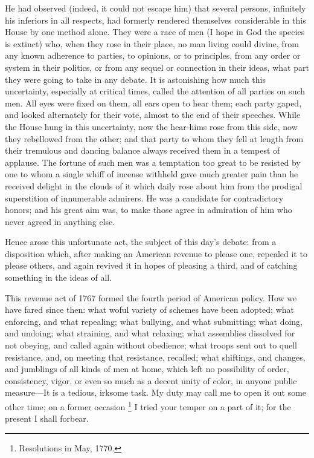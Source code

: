 He had observed (indeed, it could not escape him) that several persons, infinitely his inferiors in all respects, had formerly rendered themselves considerable in this House by one method alone. They were a race of men (I hope in God the species is extinct) who, when they rose in their place, no man living could divine, from any known adherence to parties, to opinions, or to principles, from any order or system in their politics, or from any sequel or connection in their ideas, what part they were going to take in any debate. It is astonishing how much this uncertainty, especially at critical times, called the attention of all parties on such men. All eyes were fixed on them, all ears open to hear them; each party gaped, and looked alternately for their vote, almost to the end of their speeches. While the House hung in this uncertainty, now the hear-hims rose from this side, now they rebellowed from the other; and that party to whom they fell at length from their tremulous and dancing balance always received them in a tempest of applause. The fortune of such men was a temptation too great to be resisted by one to whom a single whiff of incense withheld gave much greater pain than he received delight in the clouds of it which daily rose about him from the prodigal superstition of innumerable admirers. He was a candidate for contradictory honors; and his great aim was, to make those agree in admiration of him who never agreed in anything else.

Hence arose this unfortunate act, the subject of this day's debate: from a disposition which, after making an American revenue to please one, repealed it to please others, and again revived it in hopes of pleasing a third, and of catching something in the ideas of all.

This revenue act of 1767 formed the fourth period of American policy. How we have fared since then: what woful variety of schemes have been adopted; what enforcing, and what repealing; what bullying, and what submitting; what doing, and undoing; what straining, and what relaxing; what assemblies dissolved for not obeying, and called again without obedience; what troops sent out to quell resistance, and, on meeting that resistance, recalled; what shiftings, and changes, and jumblings of all kinds of men at home, which left no possibility of order, consistency, vigor, or even so much as a decent unity of color, in anyone public measure—It is a tedious, irksome task. My duty may call me to open it out some other time; on a former occasion
\footnote{Resolutions in May, 1770.}
I tried your temper on a part of it; for the present I shall forbear.

